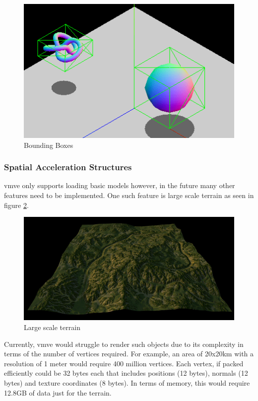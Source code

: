 \documentclass[11pt]{article}
\begin{document}
\begin{figure}[h!]
  \centering
  \includegraphics[width=\textwidth]{images/bounding_boxes.png}
  \caption{Bounding Boxes \cite{bounding_boxes}}
  \label{fig:bounding_boxes}
\end{figure}


\subsubsection{Spatial Acceleration Structures}
\gls{vmve} only supports loading basic models however, in the future many other
features need to be implemented. One such feature is large scale terrain as seen
in figure \ref{fig:quad_tree_terrain}.

\begin{figure}[h!]
  \centering
  \includegraphics[width=\textwidth]{images/quad_tree_terrain.png}
  \caption{Large scale terrain}
  \label{fig:quad_tree_terrain}
\end{figure}

Currently, \gls{vmve} would struggle to render such objects due to its
complexity in terms of the number of vertices required. For example, an area of
20x20km with a resolution of 1 meter would require 400 million vertices. Each
vertex, if packed efficiently could be 32 bytes each that includes positions (12
bytes), normals (12 bytes) and texture coordinates (8 bytes). In terms of
memory, this would require 12.8GB of data just for the terrain.
\end{document}
